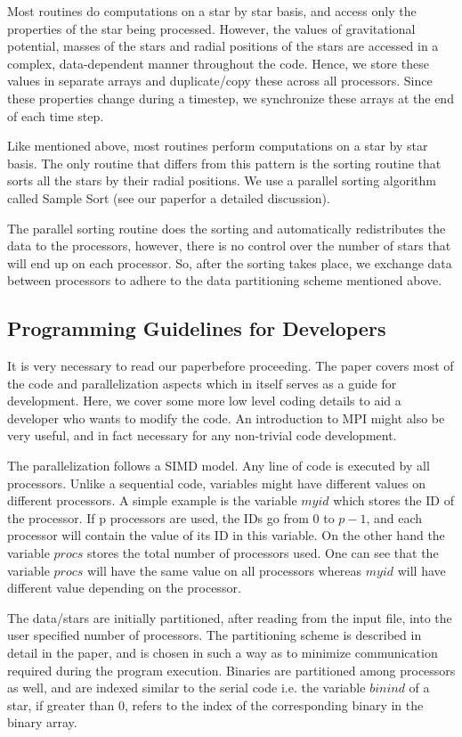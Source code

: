 \documentclass[11pt]{article}
\begin{document}
Most routines do computations on a star by star basis, and access only the properties of the star being processed. However, the values of gravitational potential, masses of the stars and radial positions of the stars are accessed in a complex, data-dependent manner throughout the code. Hence, we store these values in separate arrays and duplicate/copy these across all processors. Since these properties change during a timestep, we synchronize these arrays at the end of each time step.

Like mentioned above, most routines perform computations on a star by star basis. The only routine that differs from this pattern is the sorting routine that sorts all the stars by their radial positions. We use a parallel sorting algorithm called Sample Sort (see our paper\footnotemark[\value{footnote}] for a detailed discussion).

The parallel sorting routine does the sorting and automatically redistributes the data to the processors, however, there is no control over the number of stars that will end up on each processor. So, after the sorting takes place, we exchange data between processors to adhere to the data partitioning scheme mentioned above.

\subsection{Programming Guidelines for Developers}
It is very necessary to read our paper\footnotemark[\value{footnote}] before proceeding. The paper covers most of the code and parallelization aspects which in itself serves as a guide for development. Here, we cover some more low level coding details to aid a developer who wants to modify the code. An introduction to MPI might also be very useful, and in fact necessary for any non-trivial code development. 

The parallelization follows a SIMD model. Any line of code is executed by all processors. Unlike a sequential code, variables might have different values on different processors. A simple example is the variable $myid$ which stores the ID of the processor. If p processors are used, the IDs go from $0$ to $p-1$, and each processor will contain the value of its ID in this variable. On the other hand the variable $procs$ stores the total number of processors used. One can see that the variable $procs$ will have the same value on all processors whereas $myid$ will have different value depending on the processor.

The data/stars are initially partitioned, after reading from the input file, into the user specified number of processors. The partitioning scheme is described in detail in the paper, and is chosen in such a way as to minimize communication required during the program execution. Binaries are partitioned among processors as well, and are indexed similar to the serial code i.e. the variable $binind$ of a star, if greater than 0, refers to the index of the corresponding binary in the binary array.
\end{document}
